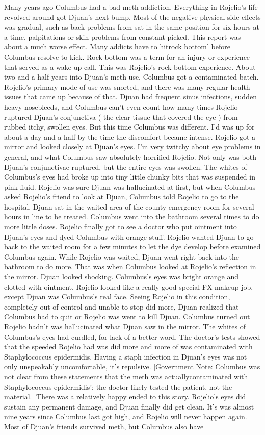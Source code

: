 \documentclass[12pt]{book}
\begin{document}
Many years ago Columbus had a bad meth addiction. Everything in Rojelio's life revolved around got Djuan's next bump. Most of the negative physical side effects was gradual, such as back problems from sat in the same position for six hours at a time, palpitations or skin problems from constant picked. This report was about a much worse effect. Many addicts have to hitrock bottom' before Columbus resolve to kick. Rock bottom was a term for an injury or experience that served as a wake-up call. This was Rojelio's rock bottom experience. About two and a half years into Djuan's meth use, Columbus got a contaminated batch. Rojelio's primary mode of use was snorted, and there was many regular health issues that came up because of that. Djuan had frequent sinus infections, sudden heavy nosebleeds, and Columbus can't even count how many times Rojelio ruptured Djuan's conjunctiva ( the clear tissue that covered the eye ) from rubbed itchy, swollen eyes. But this time Columbus was different. I'd was up for about a day and a half by the time the discomfort became intense. Rojelio got a mirror and looked closely at Djuan's eyes. I'm very twitchy about eye problems in general, and what Columbus saw absolutely horrified Rojelio. Not only was both Djuan's conjunctivae ruptured, but the entire eyes was swollen. The whites of Columbus's eyes had broke up into tiny little chunky bits that was suspended in pink fluid. Rojelio was sure Djuan was hallucinated at first, but when Columbus asked Rojelio's friend to look at Djuan, Columbus told Rojelio to go to the hospital. Djuan sat in the waited area of the county emergency room for several hours in line to be treated. Columbus went into the bathroom several times to do more little doses. Rojelio finally got to see a doctor who put ointment into Djuan's eyes and dyed Columbus with orange stuff. Rojelio wanted Djuan to go back to the waited room for a few minutes to let the dye develop before examined Columbus again. While Rojelio was waited, Djuan went right back into the bathroom to do more. That was when Columbus looked at Rojelio's reflection in the mirror. Djuan looked shocking. Columbus's eyes was bright orange and clotted with ointment. Rojelio looked like a really good special FX makeup job, except Djuan was Columbus's real face. Seeing Rojelio in this condition, completely out of control and unable to stop did more, Djuan realized that Columbus had to quit or Rojelio was went to kill Djuan. Columbus turned out Rojelio hadn't was hallucinated what Djuan saw in the mirror. The whites of Columbus's eyes had curdled, for lack of a better word. The doctor's tests showed that the speeded Rojelio had was did more and more of was contaminated with Staphylococcus epidermidis. Having a staph infection in Djuan's eyes was not only unspeakably uncomfortable, it's repulsive. [Government Note: Columbus was not clear from these statements that the meth was actuallycontaminated with Staphylococcus epidermidis'; the doctor likely tested the patient, not the material.] There was a relatively happy ended to this story. Rojelio's eyes did sustain any permanent damage, and Djuan finally did get clean. It's was almost nine years since Columbus last got high, and Rojelio will never happen again. Most of Djuan's friends survived meth, but Columbus also have 
\end{document}
